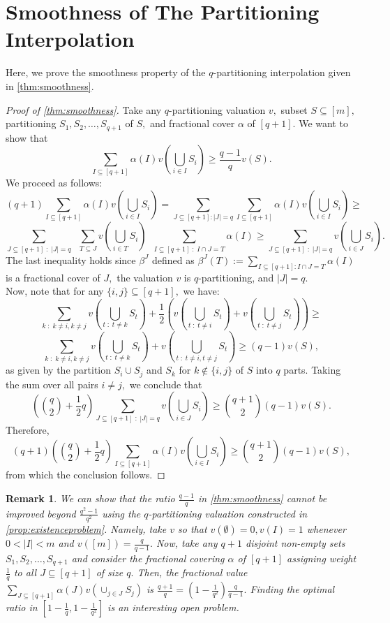 \documentclass[11pt]{article}\usepackage{amsfonts}
\newtheorem{remark}[theorem]{Remark}
\numberwithin{theorem}{subsection}
\begin{document}
\section{Smoothness of The Partitioning Interpolation}
\label{section:properties}
Here, we prove the smoothness property of the $q$-partitioning interpolation given in \cref{thm:smoothness}. 

\begin{proof}[Proof of \cref{thm:smoothness}]
Take any $q$-partitioning valuation $v,$ subset $S\subseteq [m],$ partitioning $S_1, S_2, \ldots, S_{q+1}$ of $S,$ and fractional cover $\alpha$ of $[q+1].$ We want to show that 
$$
\sum_{I\subseteq [q+1]} \alpha(I)
v(\bigcup_{i\in I}S_i)\ge 
\frac{q-1}{q}v(S).
$$
We proceed as follows:
$$
(q+1)\sum_{I\subseteq [q+1]} \alpha(I)
v(\bigcup_{i\in I}S_i) = 
\sum_{J \subseteq [q+1] : |J| = q}
\sum_{I\subseteq [q+1]} \alpha(I)
v(\bigcup_{i\in I}S_i) \ge 
$$
$$
\sum_{J \subseteq [q+1]\; : \; |J| = q}\; \;
\sum_{T \subseteq J} v(\bigcup_{i \in T}S_i)\; \; 
\sum_{I \subseteq [q+1]\; : \;I\cap J = T} \alpha (I) \ge
\sum_{J \subseteq [q+1]\; : \;|J| = q}
v(\bigcup_{i \in J}S_i).
$$
The last inequality holds
since $\beta^J$ defined as $\beta^J(T):= \sum_{I \subseteq [q+1] : I\cap J = T} \alpha (I)$ is a fractional cover of $J,$ the valuation $v$ is $q$-partitioning, 
and $|J| = q.$\\

\noindent
Now, note that for any $\{i,j\}\subseteq [q+1],$ we have:
$$
\sum_{k\; : \; k \neq i, k \neq j}v(\bigcup_{t\; : \;t\neq k}S_t) + 
\frac{1}{2}( v(\bigcup_{t\; : \;t\neq i}S_t) + 
v(\bigcup_{t\; : \;t\neq j}S_t))\ge 
$$
$$
\sum_{k\; : \;k \neq i, k \neq j}v(\bigcup_{t\; : \;t\neq k}S_t)  + v(\bigcup_{t\; : \;t\neq i, t\neq j}S_t)\ge 
(q-1)v(S),
$$
as given by the partition $S_i\cup S_j$ and $S_k$ for $k\not \in \{i,j\}$ of $S$ into $q$ parts. Taking the sum over all pairs $i\neq j,$ we conclude that 
$$
\left(\binom{q}{2} + \frac{1}{2}q\right)\sum_{J \subseteq [q+1]\; : \;|J| = q}
v(\bigcup_{i \in J}S_i) \ge 
\binom{q+1}{2}(q-1)v(S).
$$
Therefore, 
$$
(q+1)\left(\binom{q}{2} + \frac{1}{2}q\right)\sum_{I\subseteq [q+1]} \alpha(I)
v(\bigcup_{i\in I}S_i)\ge 
\binom{q+1}{2}(q-1)v(S),
$$
from which the conclusion follows.
\end{proof}

\begin{remark}
\label{remark:closenessgap}
\normalfont
We can show that the ratio $\frac{q-1}{q}$ in \cref{thm:smoothness} cannot be improved beyond $ \frac{q^2 - 1}{q^2}$ using
the $q$-partitioning valuation constructed in \cref{prop:existenceproblem}. Namely, take $v$ so that $v(\emptyset) =0,
v(I) = 1$ whenever $0 <|I|<m$ and $v([m]) =\frac{q}{q-1}.$ Now, take any $q+1$ disjoint non-empty sets $S_1, S_2, \ldots, S_{q+1}$ and consider the fractional covering $\alpha$ of $[q+1]$
assigning weight $\frac{1}{q}$ to all $J\subseteq [q+1]$ of  size $q.$ Then, the fractional value 
$\displaystyle \sum_{J \subseteq [q+1]}\alpha(J)v(\cup_{j \in J}S_j)$
is $\frac{q+1}{q} = (1 - \frac{1}{q^2})\frac{q}{q-1}.$ Finding the optimal ratio in $[1 - \frac{1}{q}, 1 - \frac{1}{q^2}]$ is an interesting open problem.
\end{remark}
\end{document}
